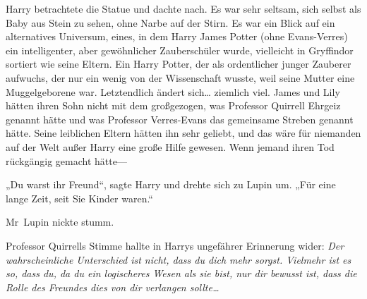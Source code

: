 Harry betrachtete die Statue und dachte nach. Es war sehr seltsam, sich selbst als Baby aus Stein zu sehen, ohne Narbe auf der Stirn. Es war ein Blick auf ein alternatives Universum, eines, in dem Harry James Potter (ohne Evans-Verres) ein intelligenter, aber gewöhnlicher Zauberschüler wurde, vielleicht in Gryffindor sortiert wie seine Eltern. Ein Harry Potter, der als ordentlicher junger Zauberer aufwuchs, der nur ein wenig von der Wissenschaft wusste, weil seine Mutter eine Muggelgeborene war. Letztendlich ändert sich… ziemlich viel. James und Lily hätten ihren Sohn nicht mit dem großgezogen, was Professor Quirrell Ehrgeiz genannt hätte und was Professor Verres-Evans das gemeinsame Streben genannt hätte. Seine leiblichen Eltern hätten ihn sehr geliebt, und das wäre für niemanden auf der Welt außer Harry eine große Hilfe gewesen. Wenn jemand ihren Tod rückgängig gemacht hätte—

„Du warst ihr Freund“, sagte Harry und drehte sich zu Lupin um.
„Für eine lange Zeit, seit Sie Kinder waren.“

Mr~Lupin nickte stumm.

Professor Quirrells Stimme hallte in Harrys ungefährer Erinnerung wider: \emph{Der wahrscheinliche Unterschied ist nicht, dass du dich mehr sorgst. Vielmehr ist es so, dass du, da du ein logischeres Wesen als sie bist, nur dir bewusst ist, dass die Rolle des Freundes dies von dir verlangen sollte…}

